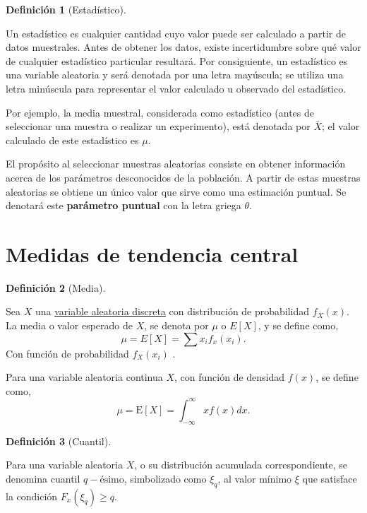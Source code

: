 \documentclass[
  us-letterpaper,
]{scrreprt}
\theoremstyle{plain}
\theoremstyle{definition}
\newtheorem{definition}{Definición}[chapter]
\theoremstyle{definition}
\theoremstyle{remark}
\begin{document}
\begin{definition}[Estadístico]\protect\hypertarget{def-estadístico}{}\label{def-estadístico}

Un estadístico es cualquier cantidad cuyo valor puede ser calculado a
partir de datos muestrales. Antes de obtener los datos, existe
incertidumbre sobre qué valor de cualquier estadístico particular
resultará. Por consiguiente, un estadístico es una variable aleatoria y
será denotada por una letra mayúscula; se utiliza una letra minúscula
para representar el valor calculado u observado del estadístico.

\end{definition}

Por ejemplo, la media muestral, considerada como estadístico (antes de
seleccionar una muestra o realizar un experimento), está denotada por
\(\bar{X}\); el valor calculado de este estadístico es \(\mu\).

El propósito al seleccionar muestras aleatorias consiste en obtener
información acerca de los parámetros desconocidos de la población. A
partir de estas muestras aleatorias se obtiene un único valor que sirve
como una estimación puntual. Se denotará este \textbf{parámetro puntual}
con la letra griega \(\theta\).

\section{Medidas de tendencia
central}\label{medidas-de-tendencia-central}

\begin{definition}[Media]\protect\hypertarget{def-media}{}\label{def-media}

Sea \(X\) una \hyperref[sec-VAD]{variable aleatoria discreta} con
distribución de probabilidad \(f_X(x)\). La media o valor esperado de
\(X\), se denota por \(\mu\) o \(E[X]\), y se define como,
\[\mu = E[X] = \sum x_i f_x (x_i). \] Con función de probabilidad
\(f_X(x_i)\) .

Para una variable aleatoria continua \(X\), con función de densidad
\(f(x)\), se define como,
\[\mu = \mathrm E[X]=\int_{-\infty}^\infty x f(x)dx .\]

\end{definition}

\begin{definition}[Cuantil]\protect\hypertarget{def-cuantil}{}\label{def-cuantil}

Para una variable aleatoria \(X\), o su distribución acumulada
correspondiente, se denomina cuantil \(q-\text{ésimo}\), simbolizado
como \(\xi_q\), al valor mínimo \(\xi\) que satisface la condición
\(F_x(\xi_q) \geq q\).

\end{definition}
\end{document}
